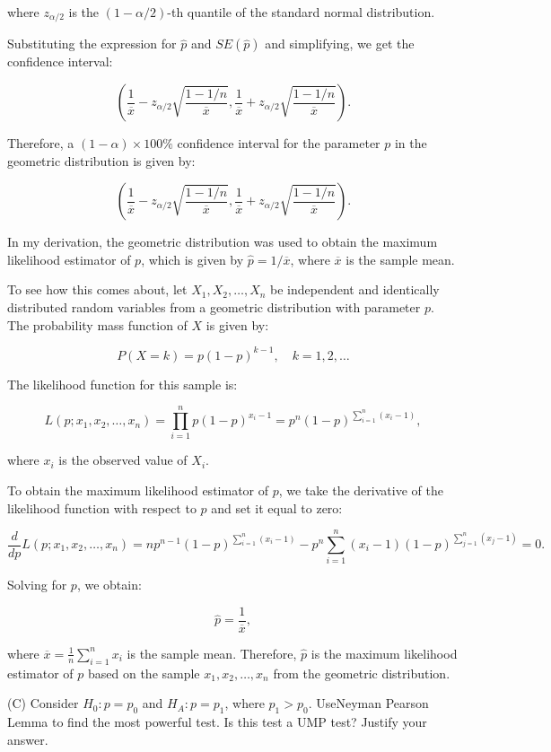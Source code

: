 \documentclass[11pt]{article}
\begin{document}
where $z_{\alpha/2}$ is the $(1 - \alpha/2)$-th quantile of the standard normal distribution.

Substituting the expression for $\hat{p}$ and $SE(\hat{p})$ and simplifying, we get the confidence interval:

$$ \left(\frac{1}{\overline{x}} - z_{\alpha/2}\sqrt{\frac{1 - 1/n}{\overline{x}}},\frac{1}{\overline{x}} + z_{\alpha/2}\sqrt{\frac{1 - 1/n}{\overline{x}}}\right). $$

Therefore, a $(1-\alpha)\times 100\%$ confidence interval for the parameter $p$ in the geometric distribution is given by:

$$ \left(\frac{1}{\overline{x}} - z_{\alpha/2}\sqrt{\frac{1 - 1/n}{\overline{x}}},\frac{1}{\overline{x}} + z_{\alpha/2}\sqrt{\frac{1 - 1/n}{\overline{x}}}\right). $$

In my derivation, the geometric distribution was used to obtain the maximum likelihood estimator of $p$, which is given by $\hat{p} = 1/\overline{x}$, where $\overline{x}$ is the sample mean.

To see how this comes about, let $X_1, X_2, \ldots, X_n$ be independent and identically distributed random variables from a geometric distribution with parameter $p$. The probability mass function of $X$ is given by:

$$ P(X=k) = p(1-p)^{k-1}, \quad k=1,2,\ldots $$

The likelihood function for this sample is:

$$ L(p; x_1, x_2, \ldots, x_n) = \prod_{i=1}^n p(1-p)^{x_i-1} = p^n(1-p)^{\sum_{i=1}^n (x_i-1)}, $$

where $x_i$ is the observed value of $X_i$.

To obtain the maximum likelihood estimator of $p$, we take the derivative of the likelihood function with respect to $p$ and set it equal to zero:

$$ \frac{d}{dp}L(p; x_1, x_2, \ldots, x_n) = np^{n-1}(1-p)^{\sum_{i=1}^n (x_i-1)} - p^n\sum_{i=1}^n(x_i-1)(1-p)^{\sum_{j=1}^n (x_j-1)} = 0. $$

Solving for $p$, we obtain:

$$ \hat{p} = \frac{1}{\overline{x}}, $$

where $\overline{x} = \frac{1}{n}\sum_{i=1}^n x_i$ is the sample mean. Therefore, $\hat{p}$ is the maximum likelihood estimator of $p$ based on the sample $x_1, x_2, \ldots, x_n$ from the geometric distribution.

(C) Consider $H_0 :p=p_0$ and $H_A :p=p_1$, where $p_1 >p_0$. UseNeyman Pearson Lemma to find the most powerful test. Is this test a UMP test? Justify your answer.
\end{document}
